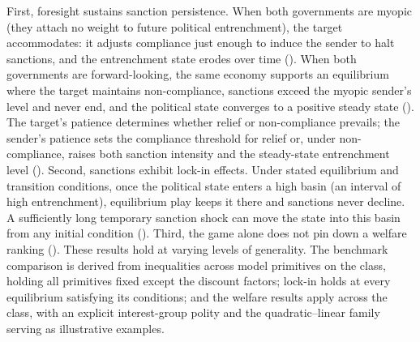 First, foresight
sustains sanction persistence. When both governments are myopic (they attach no
weight to future political entrenchment), the target accommodates: it adjusts
compliance just enough to induce the sender to halt sanctions, and the entrenchment
state erodes over time (). When both governments are
forward-looking, the same economy supports an equilibrium where the target
maintains non-compliance, sanctions exceed the myopic sender's level and never end,
and the political state converges to a positive steady state
(). The target's patience determines whether relief or
non-compliance prevails; the sender's patience sets the compliance threshold for
relief or, under non-compliance, raises both sanction intensity and the steady-state
entrenchment level (). Second,
sanctions exhibit lock-in effects. Under stated equilibrium and transition
conditions, once the political state enters a high basin (an interval of high
entrenchment), equilibrium play keeps it there and sanctions never decline. A
sufficiently long temporary sanction shock can move the state into this basin from
any initial condition (). Third, the game alone does not pin down
a welfare ranking (). These results hold at varying levels of
generality. The benchmark comparison is derived from inequalities across model
primitives on the class, holding all primitives fixed except the discount factors;
lock-in holds at every equilibrium satisfying its conditions; and the welfare
results apply across the class, with an explicit interest-group polity and the
quadratic--linear family serving as illustrative examples.

